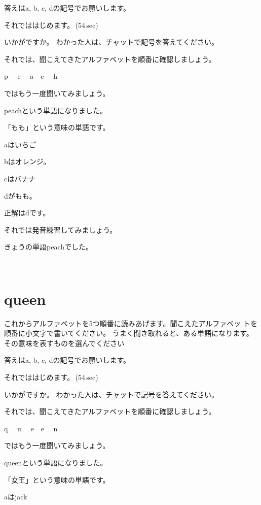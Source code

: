 \documentclass[12pt]{jlreq}
\begin{document}
答えはa, b, c, dの記号でお願いします。

それでははじめます。\faVolumeUp\,(54\,sec)

いかがですか。
わかった人は、チャットで記号を答えてください。

それでは、聞こえてきたアルファベットを順番に確認しましょう。{\large \ComputerMouse}

p\,\,
{\large \ComputerMouse}\,\,
e\,\,
{\large \ComputerMouse}\,\,
a
{\large \ComputerMouse}\,\,
c\,\,
{\large \ComputerMouse}\,\,
h\,\,

ではもう一度聞いてみましょう。

peachという単語になりました。

「もも」という意味の単語です。

aはいちご

bはオレンジ。

cはバナナ

dがもも。


正解はdです。

それでは発音練習してみましょう。

きょうの単語peachでした。

{\large \ComputerMouse}\,\,

\newpage
\section{queen}

これからアルファベットを5つ順番に読みあげます。聞こえたアルファベッ
トを順番に小文字で書いてください。
うまく聞き取れると、ある単語になります。
その意味を表すものを選んでください

答えはa, b, c, dの記号でお願いします。

それでははじめます。\faVolumeUp\,(54\,sec)

いかがですか。
わかった人は、チャットで記号を答えてください。

それでは、聞こえてきたアルファベットを順番に確認しましょう。{\large \ComputerMouse}

q\,\,
{\large \ComputerMouse}\,\,
u\,\,
{\large \ComputerMouse}\,\,
e
{\large \ComputerMouse}\,\,
e\,\,
{\large \ComputerMouse}\,\,
n\,\,

ではもう一度聞いてみましょう。

queenという単語になりました。

「女王」という意味の単語です。

aはjack
\end{document}

